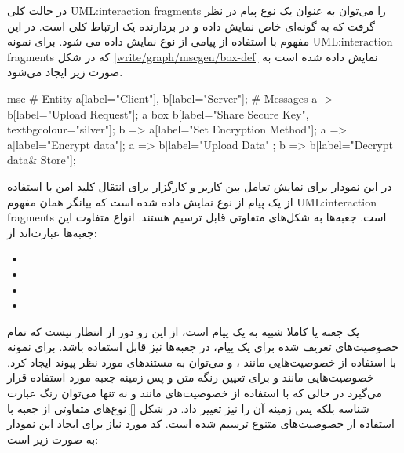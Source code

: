 در حالت کلی \glspl{UML:interaction fragment} را می‌توان به عنوان یک نوع پیام در
نظر گرفت که به گونه‌ای خاص نمایش داده و در بردارنده یک ارتباط کلی است. در
 این مفهوم با استفاده از پیامی از نوع  نمایش داده می شود.
برای نمونه \glspl{UML:interaction fragment} که در شکل
\ref{write/graph/mscgen/box-def} نمایش داده شده است به صورت زیر ایجاد می‌شود.

\begin{MSC}
msc {
	# Entity
	a[label="Client"],
	b[label="Server"];
	# Messages
	a -> b[label="Upload Request"];
	a box b[label="Share Secure Key", textbgcolour="silver"];
	b => a[label="Set Encryption Method"];
	a => a[label="Encrypt data"];
	a => b[label="Upload Data"];
	b => b[label="Decrypt data& Store"];
}
\end{MSC}

در این نمودار برای نمایش تعامل بین کاربر و کارگزار برای انتقال کلید امن با
استفاده از یک پیام از نوع   نمایش داده شده است که بیانگر همان مفهوم
\glspl{UML:interaction fragment} است. جعبه‌ها به شکل‌های متفاوتی قابل ترسیم
هستند. انواع متفاوت این جعبه‌ها عبارت‌اند از:

\begin{itemize}
  \item {}
  \item {}
  \item {}
  \item {}
\end{itemize}

یک جعبه یا  کاملا شبیه به یک پیام است، از این رو دور از انتظار نیست که
تمام خصوصیت‌های تعریف شده برای یک پیام، در جعبه‌ها نیز قابل استفاده باشد. برای
نمونه با استفاده از خصوصیت‌هایی مانند ،  و  می‌توان به
مستند‌های مورد نظر پیوند ایجاد کرد. خصوصیت‌هایی مانند  و
 برای تعیین رنگه متن و پس زمینه جعبه مورد استفاده قرار
می‌گیرد در حالی که با استفاده از خصوصیت‌های مانند  و
 نه تنها می‌توان رنگ عبارت شناسه بلکه پس زمینه آن را نیز تغییر
داد. در شکل \ref{} 
نوع‌های متفاوتی از جعبه با استفاده از خصوصیت‌های متنوع ترسیم شده است. کد مورد
نیاز برای ایجاد این نمودار به صورت زیر است:


